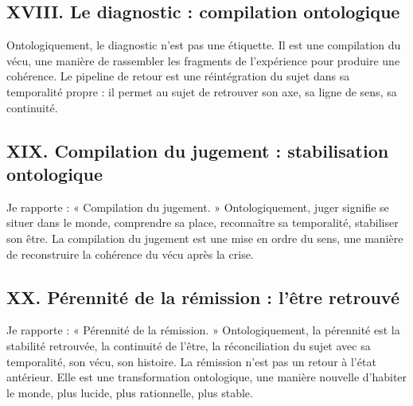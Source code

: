 \documentclass[12pt,a4paper]{article}
\begin{document}
\subsection*{XVIII. Le diagnostic : compilation ontologique}
Ontologiquement, le diagnostic n’est pas une étiquette. Il est une compilation du vécu, une manière de rassembler les fragments de l’expérience pour produire une cohérence.
Le pipeline de retour est une réintégration du sujet dans sa temporalité propre : il permet au sujet de retrouver son axe, sa ligne de sens, sa continuité.

\subsection*{XIX. Compilation du jugement : stabilisation ontologique}
Je rapporte :
« Compilation du jugement. »
Ontologiquement, juger signifie se situer dans le monde, comprendre sa place, reconnaître sa temporalité, stabiliser son être.
La compilation du jugement est une mise en ordre du sens, une manière de reconstruire la cohérence du vécu après la crise.

\subsection*{XX. Pérennité de la rémission : l’être retrouvé}
Je rapporte :
« Pérennité de la rémission. »
Ontologiquement, la pérennité est la stabilité retrouvée, la continuité de l’être, la réconciliation du sujet avec sa temporalité, son vécu, son histoire.
La rémission n’est pas un retour à l’état antérieur. Elle est une transformation ontologique, une manière nouvelle d’habiter le monde, plus lucide, plus rationnelle, plus stable.
\end{document}
